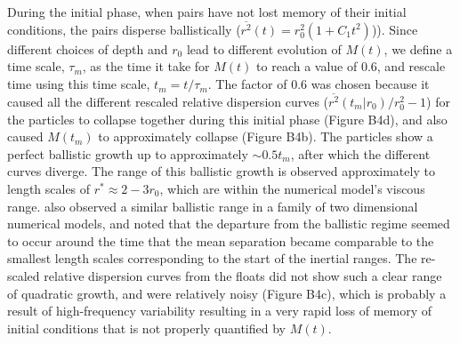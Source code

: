 \documentclass[]{ametsoc}
\begin{document}
During the initial phase, when pairs have not lost memory of their initial conditions, the pairs disperse ballistically ($\overline{r^2}(t) = r_0^2 (1 + C_1t^2)$)). Since different choices of depth and $r_0$ lead to different evolution of $M(t)$, we define a time scale, $\tau_m$, as the time it take for $M(t)$ to reach a value of 0.6, and rescale time using this time scale, $t_m = t/\tau_m$. The factor of 0.6 was chosen because it caused all the different rescaled relative dispersion curves ($\overline{r^2} (t_m | r_0) /r_0^2 -1$) for the particles to collapse together during this initial phase (Figure B4d), and also caused $M(t_m)$ to approximately collapse (Figure B4b). The particles show a perfect ballistic growth up to approximately $\sim 0.5t_m$, after which the different curves diverge. %
The range of this ballistic growth is observed approximately to length scales of $r^* \approx 2-3r_0$, which are within the numerical model's viscous range. \citet{foussard2017relative} also observed a similar ballistic range in a family of two dimensional numerical models, and noted that the departure from the ballistic regime seemed to occur around the time that the mean separation became comparable to the smallest length scales corresponding to the start of the inertial ranges. The re-scaled relative dispersion curves from the floats did not show such a clear range of quadratic growth, and were relatively noisy (Figure B4c), which is probably a result of high-frequency variability resulting in a very rapid loss of memory of initial conditions that is not properly quantified by $M(t)$.
\end{document}
